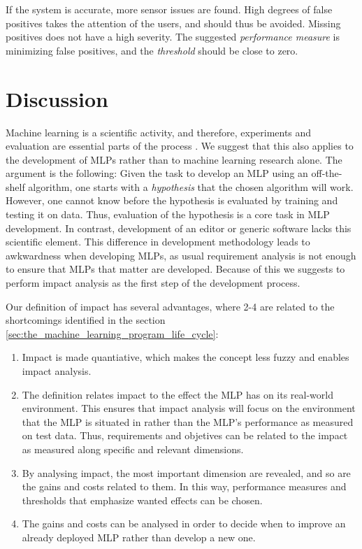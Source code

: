 \documentclass{article}
\begin{document}
If the system is accurate, more sensor issues are found.
High degrees of false positives takes the attention of the users, and should thus be avoided. 
Missing positives does not have a high severity.
The suggested \emph{performance measure} is minimizing false positives, and the \emph{threshold} should be close to zero.

\section{Discussion}
\label{sec:discussion}
Machine learning is a scientific activity, and therefore, experiments and evaluation are essential parts of the process \cite{Langley_1988}.
We suggest that this also applies to the development of MLPs rather than to machine learning research alone.
The argument is the following: 
Given the task to develop an MLP using an off-the-shelf algorithm, one starts with a \emph{hypothesis} that the chosen algorithm will work.
However, one cannot know before the hypothesis is evaluated by training and testing it on data.
Thus, evaluation of the hypothesis is a core task in MLP development.
In contrast, development of an editor or generic software lacks this scientific element.
This difference in development methodology leads to awkwardness when developing MLPs, as usual requirement analysis is not enough to ensure that MLPs that matter are developed.
Because of this we suggests to perform impact analysis as the first step of the development process.

Our definition of impact has several advantages, where 2-4 are related to the shortcomings identified in the section \ref{sec:the_machine_learning_program_life_cycle}:

\begin{enumerate}

\item
Impact is made quantiative, which makes the concept less fuzzy and enables impact analysis.


\item
The definition relates impact to the effect the MLP has on its real-world environment. 
This ensures that impact analysis will focus on the environment that the MLP is situated in rather than the MLP's performance as measured on test data. 
Thus, requirements and objetives can be related to the impact as measured along specific and relevant dimensions.

\item
By analysing impact, the most important dimension are revealed, and so are the gains and costs related to them.
In this way, performance measures and thresholds that emphasize wanted effects can be chosen.

\item
The gains and costs can be analysed in order to decide when to improve an already deployed MLP rather than develop a new one.
\end{enumerate}
\end{document}
